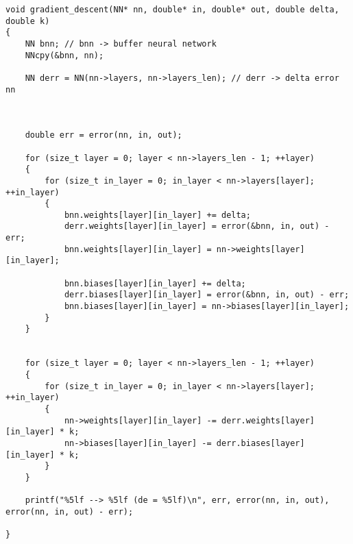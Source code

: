 \documentclass{article}
\begin{document}
        \lstset{language=C}
        \begin{lstlisting}
void gradient_descent(NN* nn, double* in, double* out, double delta, double k)
{
    NN bnn; // bnn -> buffer neural network
    NNcpy(&bnn, nn);
    
    NN derr = NN(nn->layers, nn->layers_len); // derr -> delta error nn



    double err = error(nn, in, out);

    for (size_t layer = 0; layer < nn->layers_len - 1; ++layer)
    {
        for (size_t in_layer = 0; in_layer < nn->layers[layer]; ++in_layer)
        {
            bnn.weights[layer][in_layer] += delta;
            derr.weights[layer][in_layer] = error(&bnn, in, out) - err;
            bnn.weights[layer][in_layer] = nn->weights[layer][in_layer];

            bnn.biases[layer][in_layer] += delta;
            derr.biases[layer][in_layer] = error(&bnn, in, out) - err;
            bnn.biases[layer][in_layer] = nn->biases[layer][in_layer];
        }
    }


    for (size_t layer = 0; layer < nn->layers_len - 1; ++layer)
    {
        for (size_t in_layer = 0; in_layer < nn->layers[layer]; ++in_layer)
        {
            nn->weights[layer][in_layer] -= derr.weights[layer][in_layer] * k;
            nn->biases[layer][in_layer] -= derr.biases[layer][in_layer] * k;
        }
    }

    printf("%5lf --> %5lf (de = %5lf)\n", err, error(nn, in, out), error(nn, in, out) - err);

}
        \end{lstlisting}







\end{document}
